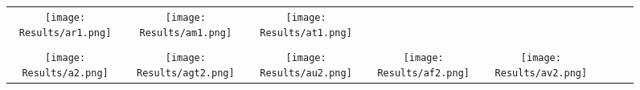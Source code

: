 \documentclass[journal]{IEEEtran}
\begin{document}
\begin{figure*}[!t]
\begin{tabular}{cccccccc}
		\hspace{0.4cm}
		\begin{minipage}{30pt}
			\texttt{[image: Results/ar1.png]}
\end{minipage}
		&
		\hspace{0.4cm}
		\begin{minipage}{30pt}
			\texttt{[image: Results/am1.png]}
\end{minipage}
		&
		\hspace{0.4cm}
		\begin{minipage}{30pt}
			\texttt{[image: Results/at1.png]}
\end{minipage}
		\\
		\\
		\begin{minipage}{30pt}
			\texttt{[image: Results/a2.png]}
\end{minipage}
		&
		\hspace{0.4cm}
		\begin{minipage}{30pt}
			\texttt{[image: Results/agt2.png]}
\end{minipage}
		&
		\hspace{0.4cm}
		\begin{minipage}{30pt}
			\texttt{[image: Results/au2.png]}
\end{minipage}
		&
		\hspace{0.4cm}
		\begin{minipage}{30pt}
			\texttt{[image: Results/af2.png]}
\end{minipage}
		&
		\hspace{0.4cm}
		\begin{minipage}{30pt}
			\texttt{[image: Results/av2.png]}
\end{minipage}
		

\end{tabular}
\end{figure*}
\end{document}
